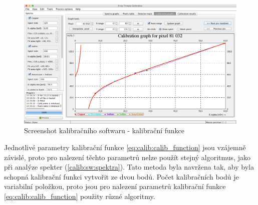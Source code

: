 \begin{figure}[t]
	\begin{center}
		\includegraphics[width=15cm]{figures/calibsw_cc.png}
		\caption{Screenshot kalibračního softwaru - kalibrační funkce}
		\label{fig:calib:sw_calib_function}
	\end{center}
\end{figure}

Jednotlivé parametry kalibrační funkce \ref{eq:calib:calib_function} jsou vzájemně závislé, proto pro nalezení těchto parametrů nelze použít stejný algoritmus, jako při analýze spekter (\ref{calib:sw:spektra}). Tato metoda byla navržena tak, aby byla schopná kalibrační funkci vytvořit ze dvou bodů. Počet kalibračních bodů je variabilní položkou, proto jsou pro nalezení parametrů kalibrační funkce \ref{eq:calib:calib_function} použity různé algoritmy.

